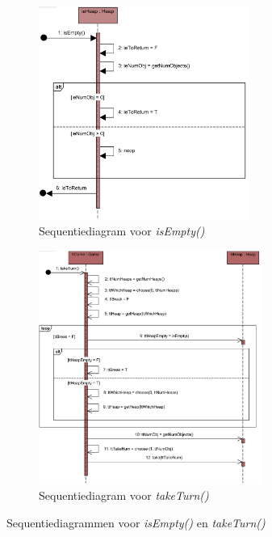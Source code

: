 \begin{landscape}
	\newpage
	\thispagestyle{empty}
	
	\begin{figure}
		\begin{subfigure}{\textwidth}
			\includegraphics[width=0.75\textwidth]{chap-evaluatie/isEmpty.png}
			\caption{Sequentiediagram voor \textit{isEmpty()}}
			\label{fig:nim-isEmpty}
		\end{subfigure}%
		\begin{subfigure}{\textwidth}
			\includegraphics[width=0.8\textwidth]{chap-evaluatie/takeTurn.png}
			\caption{Sequentiediagram voor \textit{takeTurn()}}
			\label{fig:nim-takeTurn}
		\end{subfigure}
		\caption{Sequentiediagrammen voor \textit{isEmpty()} en \textit{takeTurn()}}
		\label{fig:nim-isempty-tt}
	\end{figure}
\end{landscape}

